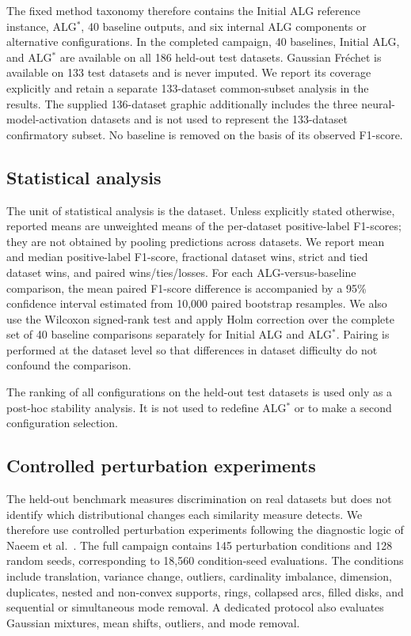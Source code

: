 \documentclass[preprint,12pt]{elsarticle}
\begin{document}
The fixed method taxonomy therefore contains the Initial ALG reference instance,
ALG$^*$, 40 baseline outputs, and six internal ALG components or alternative
configurations.
In the completed campaign, 40 baselines, Initial ALG, and ALG$^*$ are available
on all 186 held-out test datasets. Gaussian Fr\'echet is available on 133 test
datasets and is never imputed. We report its coverage explicitly and retain a
separate 133-dataset common-subset analysis in the results. The supplied
136-dataset graphic additionally includes the three neural-model-activation
datasets and is not used to represent the 133-dataset confirmatory subset. No
baseline is removed on the basis of its observed F1-score.

\subsection{Statistical analysis}

The unit of statistical analysis is the dataset. Unless explicitly stated
otherwise, reported means are unweighted means of the per-dataset
positive-label F1-scores; they are not obtained by pooling predictions across
datasets. We report mean and median positive-label F1-score, fractional dataset
wins, strict and tied dataset wins, and paired wins/ties/losses. For each
ALG-versus-baseline comparison, the mean paired F1-score difference is
accompanied by a 95\% confidence interval estimated from 10,000 paired bootstrap
resamples. We also use the Wilcoxon signed-rank test and apply Holm correction
over the complete set of 40 baseline comparisons separately for Initial ALG
and ALG$^*$. Pairing is performed at the dataset level so that
differences in dataset difficulty do not confound the comparison.

The ranking of all configurations on the held-out test datasets is used only as
a post-hoc stability analysis. It is not used to redefine ALG$^*$ or to make a
second configuration selection.

\subsection{Controlled perturbation experiments}

The held-out benchmark measures discrimination on real datasets but does not
identify which distributional changes each similarity measure detects. We
therefore use controlled perturbation experiments following the diagnostic
logic of Naeem et al.~\cite{naeem2020reliable}. The full campaign contains 145
perturbation conditions and 128 random seeds, corresponding to 18,560
condition-seed evaluations. The conditions include translation, variance
change, outliers, cardinality imbalance, dimension, duplicates, nested and
non-convex supports, rings, collapsed arcs, filled disks, and sequential or
simultaneous mode removal. A dedicated protocol also evaluates Gaussian
mixtures, mean shifts, outliers, and mode removal.
\end{document}

